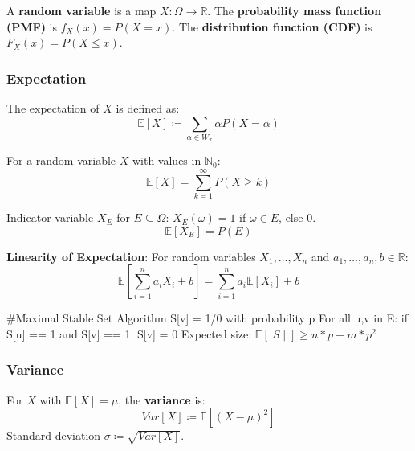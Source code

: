 \begin{definition}
A \textbf{random variable} is a map $X: \Omega \to \mathbb{R}$.
The \textbf{probability mass function (PMF)} is $f_X(x) = P(X=x)$.
The \textbf{distribution function (CDF)} is $F_X(x) = P(X \leq x)$.
\end{definition}

\subsubsection{Expectation}

\begin{definition}
The expectation of $X$ is defined as:
$$\mathbb{E}[X] \coloneqq \sum_{\alpha \in W_x} \alpha P(X=\alpha)$$
\end{definition}

\begin{theorem}
For a random variable $X$ with values in $\mathbb{N}_0$:
$$\mathbb{E}[X] = \sum_{k=1}^\infty P(X \geq k)$$
\end{theorem}

\begin{definition}
Indicator-variable $X_E$ for $E \subseteq \Omega$:
$X_E(\omega) = 1$ if $\omega \in E$, else $0$.
$$\mathbb{E}[X_E] = P(E)$$
\end{definition}

\begin{theorem}
\textbf{Linearity of Expectation}:
For random variables $X_1, \dots, X_n$ and $a_1, \dots, a_n, b \in \mathbb{R}$:
$$\mathbb{E}[\sum_{i=1}^n a_i X_i + b] = \sum_{i=1}^n a_i \mathbb{E}[X_i] + b$$
\end{theorem}

\begin{algorithm}
#Maximal Stable Set Algorithm
S[v] = 1/0 with probability p
For all {u,v} in E:
  if S[u] == 1 and S[v] == 1: S[v] = 0
Expected size: $\mathbb{E}[\mid S \mid] \geq n*p - m*p^2$
\end{algorithm}

\subsubsection{Variance}

\begin{definition}
For $X$ with $\mathbb{E}[X] = \mu$, the \textbf{variance} is:
$$Var[X] \coloneqq \mathbb{E}[(X-\mu)^2]$$
Standard deviation $\sigma \coloneqq \sqrt{Var[X]}$.
\end{definition}

